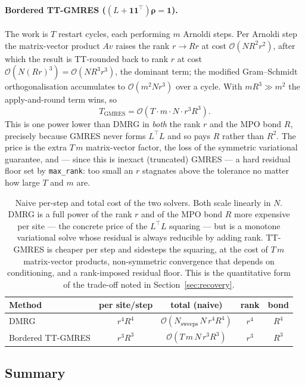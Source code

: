 \documentclass[12pt]{article}
\newcommand{\bigO}[1]{\mathcal{O}\left(#1\right)}
\newcommand{\brho}{\boldsymbol{\rho}}
\theoremstyle{definition}
\theoremstyle{remark}
\begin{document}
\paragraph{Bordered TT-GMRES ($(L + \mathbf{1}\mathbf{1}^\top)\brho = \mathbf{1}$).}
The work is $T$ restart cycles, each performing $m$ Arnoldi steps. Per Arnoldi step the matrix-vector product $Av$ raises the rank $r \to Rr$ at cost $\bigO{N R^2 r^2}$, after which the result is TT-rounded back to rank $r$ at cost $\bigO{N (Rr)^3} = \bigO{N R^3 r^3}$, the dominant term; the modified Gram--Schmidt orthogonalisation accumulates to $\bigO{m^2 N r^3}$ over a cycle. With $m R^3 \gg m^2$ the apply-and-round term wins, so
\[
T_{\mathrm{GMRES}} = \bigO{T \cdot m \cdot N \cdot r^3 R^3}.
\]
This is one power lower than DMRG in \emph{both} the rank $r$ and the MPO bond $R$, precisely because GMRES never forms $L^\top L$ and so pays $R$ rather than $R^2$. The price is the extra $T\,m$ matrix-vector factor, the loss of the symmetric variational guarantee, and --- since this is inexact (truncated) GMRES --- a hard residual floor set by \texttt{max\_rank}: too small an $r$ stagnates above the tolerance no matter how large $T$ and $m$ are.

\begin{table}[H]
\centering
\begin{tabular}{l c c c c}
\hline
Method & per site/step & total (naive) & rank & bond \\
\hline
DMRG            & $r^4 R^4$ & $\bigO{N_{\mathrm{sweeps}}\, N\, r^4 R^4}$ & $r^4$ & $R^4$ \\
Bordered TT-GMRES & $r^3 R^3$ & $\bigO{T\, m\, N\, r^3 R^3}$              & $r^3$ & $R^3$ \\
\hline
\end{tabular}
\caption{Naive per-step and total cost of the two solvers. Both scale linearly in $N$. DMRG is a full power of the rank $r$ and of the MPO bond $R$ more expensive per site --- the concrete price of the $L^\top L$ squaring --- but is a monotone variational solve whose residual is always reducible by adding rank. TT-GMRES is cheaper per step and sidesteps the squaring, at the cost of $T\,m$ matrix-vector products, non-symmetric convergence that depends on conditioning, and a rank-imposed residual floor. This is the quantitative form of the trade-off noted in Section~\ref{sec:recovery}.}
\label{tab:complexity}
\end{table}

\subsection{Summary}
\end{document}

